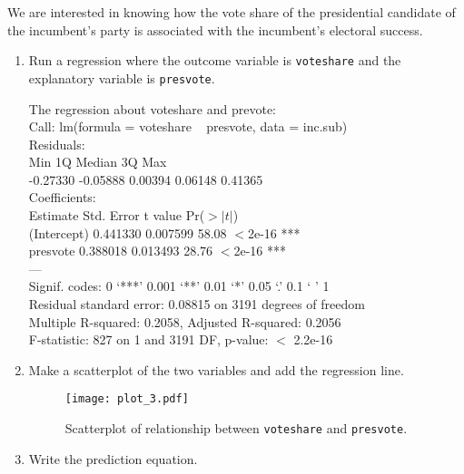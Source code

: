\documentclass[12pt,letterpaper]{article}
\begin{document}
\noindent We are interested in knowing how the vote share of the presidential candidate of the incumbent's party is associated with the incumbent's electoral success.
	\vspace{.25cm}
	\begin{enumerate}
		\item Run a regression where the outcome variable is \texttt{voteshare} and the explanatory variable is \texttt{presvote}.
			
			\vspace{.15cm}
			 
			\vspace{.15cm}
			\noindent The regression about voteshare and prevote:\\
			Call:
			lm(formula = voteshare ~ presvote, data = inc.sub)\\
			
			Residuals:\\
			Min       1Q   Median       3Q      Max \\
			-0.27330 -0.05888  0.00394  0.06148  0.41365 \\
			
			Coefficients:\\
			Estimate Std. Error t value Pr($>|t|$)    \\
			(Intercept) 0.441330   0.007599   58.08   $<$2e-16 ***\\
			presvote    0.388018   0.013493   28.76   $<$2e-16 ***\\
			---\\ 
			Signif. codes:  0 ‘***’ 0.001 ‘**’ 0.01 ‘*’ 0.05 ‘.’ 0.1 ‘ ’ 1\\
			
			Residual standard error: 0.08815 on 3191 degrees of freedom\\
			Multiple R-squared:  0.2058,	Adjusted R-squared:  0.2056 \\
			F-statistic:   827 on 1 and 3191 DF,  p-value: $<$ 2.2e-16\\
		\item Make a scatterplot of the two variables and add the regression line. 
		
		\vspace{.15cm}
		 
		\vspace{.15cm}
		\begin{figure}[h!]\centering
			
			\caption{\footnotesize Scatterplot of relationship between \texttt{voteshare} and \texttt{presvote}.}
			\label{fig:plot_3}
			\texttt{[image: plot\_3.pdf]}
		\end{figure}
		
		\item Write the prediction equation.
		
		\vspace{.15cm}
		 
		\vspace{.15cm}
		
	\end{enumerate}
	
\end{document}
